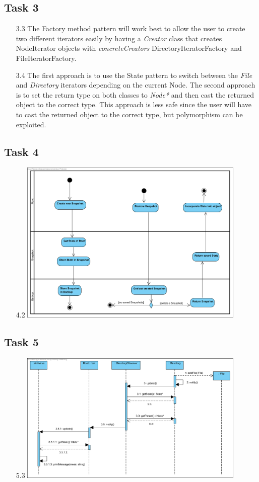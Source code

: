 \documentclass{article}
\begin{document}
\subsection*{Task 3}
\begin{itemize}
    \item[3.3]The Factory method pattern will work best to allow the user to create two different iterators 
    easily by having a \textit{Creator} class that creates NodeIterator objects with \textit{concreteCreators} DirectoryIteratorFactory and FileIteratorFactory.
    \item[3.4]The first approach is to use the State pattern to switch between the \textit{File} and \textit{Directory} iterators depending on the current Node.
    The second approach is to set the return type on both classes to \textit{Node*} and then cast the returned object to the correct type. This approach is less safe since the user will have to
    cast the returned object to the correct type, but polymorphism can be exploited.
\end{itemize}


\subsection*{Task 4}
\begin{itemize}
    \item[4.2]\includegraphics[width=0.85\textwidth]{Task43.png} 
\end{itemize}


\subsection*{Task 5}
\begin{itemize}
    \item[5.3]\includegraphics[width=0.85\textwidth]{Task53.png} 
\end{itemize}
\end{document}
